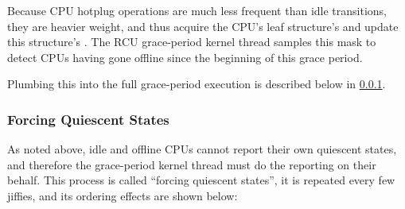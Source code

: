 \begin{center}
\end{center}

Because CPU hotplug operations are much less frequent than idle
transitions, they are heavier weight, and thus acquire the CPU's leaf
 structure's  and update this structure's
.
The RCU grace-period kernel thread samples this
mask to detect CPUs having gone offline since the beginning of this
grace period.

Plumbing this into the full grace-period execution is described below
in \cref{sec:rcu:memorder:Forcing Quiescent States}.


\subsubsection{Forcing Quiescent States}
\label{sec:rcu:memorder:Forcing Quiescent States}

As noted above, idle and offline CPUs cannot report their own quiescent
states, and therefore the grace-period kernel thread must do the
reporting on their behalf.
This process is called ``forcing quiescent
states'', it is repeated every few jiffies, and its ordering effects are
shown below:


